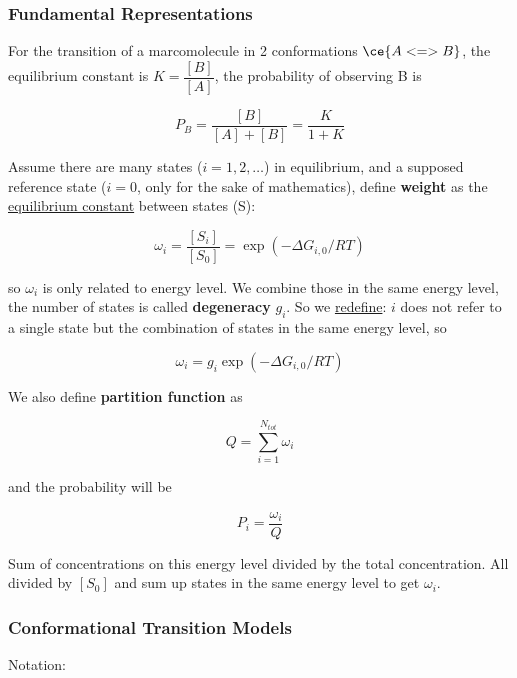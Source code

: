 \documentclass[]{article}
\begin{document}
\hypertarget{fundamental-representations}{%
\subsubsection{Fundamental
Representations}\label{fundamental-representations}}

For the transition of a marcomolecule in 2 conformations \(\ce{A<=>B}\),
the equilibrium constant is \(K=\dfrac{[B]}{[A]}\), the probability of
observing B is

\[P_B=\dfrac{[B]}{[A]+[B]}=\dfrac{K}{1+K}\]

Assume there are many states (\(i=1,2,\dots\)) in equilibrium, and a
supposed reference state (\(i=0\), only for the sake of mathematics),
define \textbf{weight} as the \underline{equilibrium constant} between
states (S):

\[\omega_i=\dfrac{[S_i]}{[S_0]}=\exp(-\Delta G_{i,0}/RT)\]

so \(\omega_i\) is only related to energy level. We combine those in the
same energy level, the number of states is called \textbf{degeneracy}
\(g_i\). So we \underline{redefine}: \(i\) does not refer to a single
state but the combination of states in the same energy level, so

\[\omega_i=g_i\exp(-\Delta G_{i,0}/RT)\]

We also define \textbf{partition function} as

\[Q=\sum_{i=1}^{N_{tot}} \omega_i\]

and the probability will be

\[P_i=\dfrac{\omega_i}{Q}\]

Sum of concentrations on this energy level divided by the total
concentration. All divided by \([S_0]\) and sum up states in the same
energy level to get \(\omega_i\).

\hypertarget{conformational-transition-models}{%
\subsubsection{Conformational Transition
Models}\label{conformational-transition-models}}

Notation:
\end{document}
